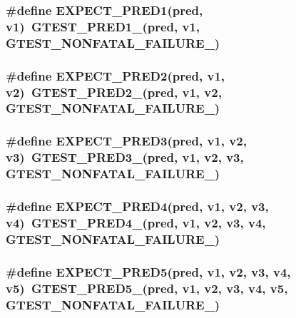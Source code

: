 \subsubsection{\setlength{\rightskip}{0pt plus 5cm}\#define EXPECT\_\-PRED1(pred, v1)~GTEST\_\-PRED1\_\-(pred, v1, GTEST\_\-NONFATAL\_\-FAILURE\_\-)}\label{gtest__pred__impl_8h_764e040be09adc3c6a06e877e83e6113}


\subsubsection{\setlength{\rightskip}{0pt plus 5cm}\#define EXPECT\_\-PRED2(pred, v1, v2)~GTEST\_\-PRED2\_\-(pred, v1, v2, GTEST\_\-NONFATAL\_\-FAILURE\_\-)}\label{gtest__pred__impl_8h_83857bdfa95ce84aec0c84f83ee30700}


\subsubsection{\setlength{\rightskip}{0pt plus 5cm}\#define EXPECT\_\-PRED3(pred, v1, v2, v3)~GTEST\_\-PRED3\_\-(pred, v1, v2, v3, GTEST\_\-NONFATAL\_\-FAILURE\_\-)}\label{gtest__pred__impl_8h_b547a2c9920df9998e46014dfa2f8dee}


\subsubsection{\setlength{\rightskip}{0pt plus 5cm}\#define EXPECT\_\-PRED4(pred, v1, v2, v3, v4)~GTEST\_\-PRED4\_\-(pred, v1, v2, v3, v4, GTEST\_\-NONFATAL\_\-FAILURE\_\-)}\label{gtest__pred__impl_8h_4b6f8cc85983d75f0975dc10dd5d7830}


\subsubsection{\setlength{\rightskip}{0pt plus 5cm}\#define EXPECT\_\-PRED5(pred, v1, v2, v3, v4, v5)~GTEST\_\-PRED5\_\-(pred, v1, v2, v3, v4, v5, GTEST\_\-NONFATAL\_\-FAILURE\_\-)}\label{gtest__pred__impl_8h_a31ecfba6da13bba51bcb8e9b9c64dd9}


